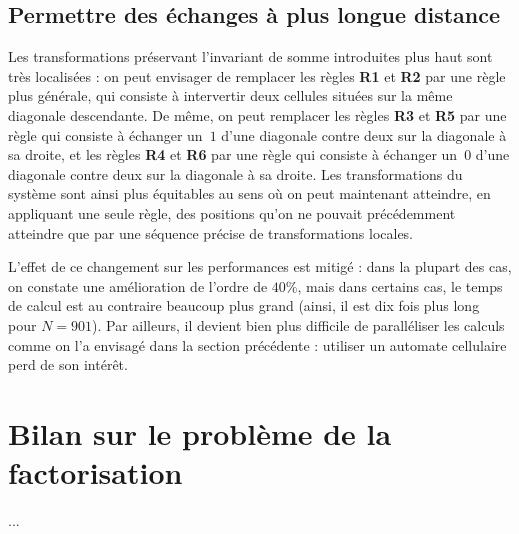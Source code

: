 
\subsection{Permettre des échanges à plus longue distance}

Les transformations préservant l'invariant de somme introduites plus haut sont très localisées : on peut envisager de remplacer les règles \textbf{R1} et \textbf{R2} par une règle plus générale, qui consiste à intervertir deux cellules situées sur la même diagonale descendante. De même, on peut remplacer les règles \textbf{R3} et \textbf{R5} par une règle qui consiste à échanger un~$1$ d'une diagonale contre deux sur la diagonale à sa droite, et les règles \textbf{R4} et \textbf{R6} par une règle qui consiste à échanger un~$0$ d'une diagonale contre deux sur la diagonale à sa droite. Les transformations du système sont ainsi plus équitables au sens où on peut maintenant atteindre, en appliquant une seule règle, des positions qu'on ne pouvait précédemment atteindre que par une séquence précise de transformations locales. 

L'effet de ce changement sur les performances est mitigé : dans la plupart des cas, on constate une amélioration de l'ordre de $40\%$, mais dans certains cas, le temps de calcul est au contraire beaucoup plus grand (ainsi, il est dix fois plus long pour $N=901$). Par ailleurs, il devient bien plus difficile de paralléliser les calculs comme on l'a envisagé dans la section précédente : utiliser un automate cellulaire perd de son intérêt.



\section*{Bilan sur le problème de la factorisation}




...


